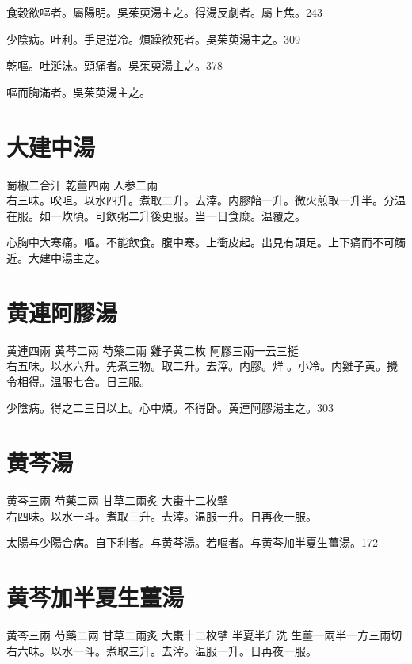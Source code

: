 食穀欲嘔者。屬陽明。{\khaaitp 吳}茱萸湯主之。得湯反劇者。屬上焦。243

少陰病。吐利。手足逆{\khaaitp 冷}。煩躁欲死者。{\khaaitp 吳}茱萸湯主之。309

乾嘔。吐涎沫。頭痛者。{\khaaitp 吳}茱萸湯主之。378

嘔而胸滿者。{\khaaitp 吳}茱萸湯主之。

\section{大建中湯}

蜀椒{\scriptsize 二合汗} 乾薑{\scriptsize 四兩} 人参{\scriptsize 二兩}\\
右三味。{\khaaitp 㕮咀。}以水四升。煮取二升。去滓。内膠飴一升。微火煎取一升半。分温在服。如一炊頃。可飲粥二升後更服。当一日食糜。温覆之。

心胸中大寒痛。嘔。不能飲食。腹中寒。上衝皮起。出見有頭足。上下痛而不可觸近。大建中湯主之。

\section{黄連阿膠湯}

黄連{\scriptsize 四兩} 黄芩{\scriptsize 二兩} 芍藥{\scriptsize 二兩} 雞子黄{\scriptsize 二枚} 阿膠{\scriptsize 三兩一云三挺}\\
右五味。以水六升。先煮三物。取二升。去滓。内膠。烊{\sungtpii 𥁞}。小冷。内雞子黄。攪令相得。温服七合。日三服。

少陰病。得之二三日以上。心中煩。不得卧。黄連阿膠湯主之。303

\section{黄芩湯}

黄芩{\scriptsize 三兩} 芍藥{\scriptsize 二兩} 甘草{\scriptsize 二兩炙} 大棗{\scriptsize 十二枚擘}\\
右四味。以水一斗。煮取三升。去滓。温服一升。日再夜一服。

太陽与少陽合病。自下利者。与黄芩湯。若嘔者。与黄芩加半夏生薑湯。172

\section{黄芩加半夏生薑湯}

黄芩{\scriptsize 三兩} 芍藥{\scriptsize 二兩} 甘草{\scriptsize 二兩炙} 大棗{\scriptsize 十二枚擘} 半夏{\scriptsize 半升洗} 生薑{\scriptsize 一兩半一方三兩切}\\
右六味。以水一斗。煮取三升。去滓。温服一升。日再夜一服。

